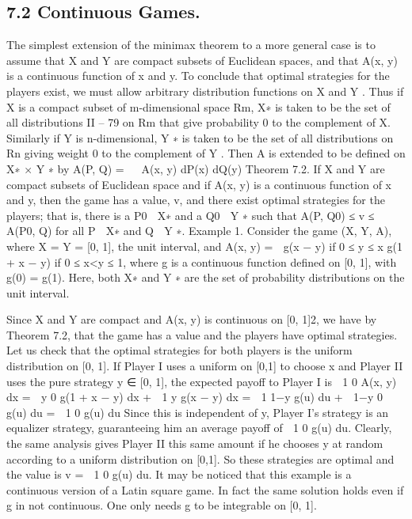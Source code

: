 \documentclass[]{report}
\begin{document}
\subsection{7.2 Continuous Games.} The simplest extension of the minimax theorem to a more
general case is to assume that X and Y are compact subsets of Euclidean spaces, and that
A(x, y) is a continuous function of x and y. To conclude that optimal strategies for the
players exist, we must allow arbitrary distribution functions on X and Y . Thus if X is a
compact subset of m-dimensional space Rm, X∗ is taken to be the set of all distributions
II – 79
on Rm that give probability 0 to the complement of X. Similarly if Y is n-dimensional,
Y ∗ is taken to be the set of all distributions on Rn giving weight 0 to the complement of
Y . Then A is extended to be defined on X∗ × Y ∗ by
A(P, Q) =   A(x, y) dP(x) dQ(y)
Theorem 7.2. If X and Y are compact subsets of Euclidean space and if A(x, y) is a
continuous function of x and y, then the game has a value, v, and there exist optimal
strategies for the players; that is, there is a P0 ∈ X∗ and a Q0 ∈ Y ∗ such that
A(P, Q0) ≤ v ≤ A(P0, Q) for all P ∈ X∗ and Q ∈ Y ∗.
Example 1. Consider the game (X, Y, A), where X = Y = [0, 1], the unit interval,
and
A(x, y) =  g(x − y) if 0 ≤ y ≤ x
g(1 + x − y) if 0 ≤ x<y ≤ 1,
where g is a continuous function defined on [0, 1], with g(0) = g(1). Here, both X∗ and
Y ∗ are the set of probability distributions on the unit interval.

Since X and Y are compact and A(x, y) is continuous on [0, 1]2, we have by Theorem
7.2, that the game has a value and the players have optimal strategies. Let us check that
the optimal strategies for both players is the uniform distribution on [0, 1]. If Player I uses
a uniform on [0,1] to choose x and Player II uses the pure strategy y ∈ [0, 1], the expected
payoff to Player I is
 1
0
A(x, y) dx =
 y
0
g(1 + x − y) dx +
 1
y
g(x − y) dx
=
 1
1−y
g(u) du +
 1−y
0
g(u) du =
 1
0
g(u) du
Since this is independent of y, Player I’s strategy is an equalizer strategy, guaranteeing
him an average payoff of  1
0 g(u) du. Clearly, the same analysis gives Player II this same
amount if he chooses y at random according to a uniform distribution on [0,1]. So these
strategies are optimal and the value is v =  1
0 g(u) du. It may be noticed that this example
is a continuous version of a Latin square game. In fact the same solution holds even if g
in not continuous. One only needs g to be integrable on [0, 1].
\end{document}

